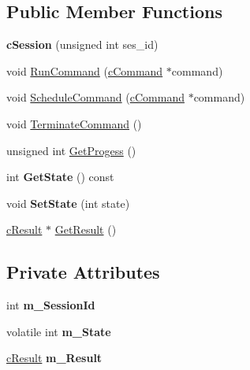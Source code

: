 \subsection*{\-Public \-Member \-Functions}
\begin{DoxyCompactItemize}
\item 
\hypertarget{classengine_1_1cSession_aafe0e5fd946fd5fa5b990617f848a5a5}{{\bfseries c\-Session} (unsigned int ses\-\_\-id)}\label{classengine_1_1cSession_aafe0e5fd946fd5fa5b990617f848a5a5}

\item 
void \hyperlink{classengine_1_1cSession_a79226f269db0a276764656791d7689f2}{\-Run\-Command} (\hyperlink{classengine_1_1cCommand}{c\-Command} $\ast$command)
\item 
void \hyperlink{classengine_1_1cSession_afcf61cec37829291b2aa8e13d2ca96e0}{\-Schedule\-Command} (\hyperlink{classengine_1_1cCommand}{c\-Command} $\ast$command)
\item 
void \hyperlink{classengine_1_1cSession_af1a1747cd7020bd4bfce782bf1ffec5d}{\-Terminate\-Command} ()
\item 
unsigned int \hyperlink{classengine_1_1cSession_ab5b73d57f8d6fd918d33b4e0a64c21d9}{\-Get\-Progess} ()
\item 
\hypertarget{classengine_1_1cSession_a4d5cfbd1a1a5d1ff022fd4915b256f4f}{int {\bfseries \-Get\-State} () const }\label{classengine_1_1cSession_a4d5cfbd1a1a5d1ff022fd4915b256f4f}

\item 
\hypertarget{classengine_1_1cSession_ac70dfa95b25fed14a6ca32df68cf1300}{void {\bfseries \-Set\-State} (int state)}\label{classengine_1_1cSession_ac70dfa95b25fed14a6ca32df68cf1300}

\item 
\hyperlink{classengine_1_1cResult}{c\-Result} $\ast$ \hyperlink{classengine_1_1cSession_aa403617485890fe288c5cf68b39ab540}{\-Get\-Result} ()
\end{DoxyCompactItemize}
\subsection*{\-Private \-Attributes}
\begin{DoxyCompactItemize}
\item 
\hypertarget{classengine_1_1cSession_a4adc27ebd913c027b736e9aa2f4142cb}{int {\bfseries m\-\_\-\-Session\-Id}}\label{classengine_1_1cSession_a4adc27ebd913c027b736e9aa2f4142cb}

\item 
\hypertarget{classengine_1_1cSession_af0edf0e0ced62ee7e8a5136637cc0084}{volatile int {\bfseries m\-\_\-\-State}}\label{classengine_1_1cSession_af0edf0e0ced62ee7e8a5136637cc0084}

\item 
\hypertarget{classengine_1_1cSession_abfc019aab8f8453fd7589266c0e00ef7}{\hyperlink{classengine_1_1cResult}{c\-Result} {\bfseries m\-\_\-\-Result}}\label{classengine_1_1cSession_abfc019aab8f8453fd7589266c0e00ef7}

\end{DoxyCompactItemize}
